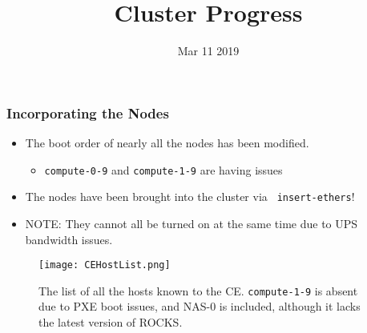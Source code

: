 \documentclass{beamer}
\title{Cluster Progress}
\date{Mar 11 2019}
\begin{document}

\begin{frame}
  \maketitle
\end{frame}



\begin{frame}

  \frametitle{Incorporating the Nodes}

  \begin{multicols}{2}

    \begin{itemize}
    \item The boot order of nearly all the nodes has been modified.
      \begin{itemize}
      \item {\tt compute-0-9} and {\tt compute-1-9} are having issues
      \end{itemize}
    \item The nodes have been brought into the cluster via {\tt
        insert-ethers}!
    \item NOTE: They cannot all be turned on at the same time due to UPS
      bandwidth issues.
    \end{itemize}

    \columnbreak

    \begin{figure}[H]
      \begin{center}
        \texttt{[image: CEHostList.png]}
      \end{center}
      \caption{The list of all the hosts known to the CE. {\tt compute-1-9} is
        absent due to PXE boot issues, and NAS-0 is included, although it lacks
        the latest version of ROCKS.}
    \end{figure}

  \end{multicols}

\end{frame}


\end{document}
